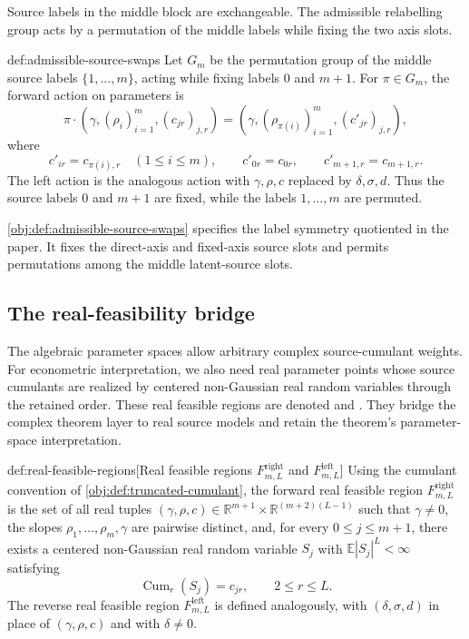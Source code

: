 Source labels in the middle block are exchangeable. The admissible relabelling group  acts by a permutation  of the middle labels while fixing the two axis slots.

\begin{definitionv}{def:admissible-source-swaps}
Let \(G_m\) be the permutation group of the middle source labels \(\{1,\ldots,m\}\), acting while fixing labels \(0\) and \(m+1\). For \(\pi\in G_m\), the forward action on parameters is
\[
\pi\cdot(\gamma,(\rho_i)_{i=1}^m,(c_{jr})_{j,r})
=
(\gamma,(\rho_{\pi(i)})_{i=1}^m,(c'_{jr})_{j,r}),
\]
where
\[
c'_{ir}=c_{\pi(i),r}\quad(1\le i\le m),\qquad
c'_{0r}=c_{0r},\qquad
c'_{m+1,r}=c_{m+1,r}.
\]
The left action is the analogous action with \(\gamma,\rho,c\) replaced by \(\delta,\sigma,d\). Thus the source labels \(0\) and \(m+1\) are fixed, while the labels \(1,\ldots,m\) are permuted.
\end{definitionv}

\cref{obj:def:admissible-source-swaps} specifies the label symmetry quotiented in the paper. It fixes the direct-axis and fixed-axis source slots and permits permutations among the middle latent-source slots.

\subsection{The real-feasibility bridge}

The algebraic parameter spaces allow arbitrary complex source-cumulant weights. For econometric interpretation, we also need real parameter points whose source cumulants are realized by centered non-Gaussian real random variables through the retained order. These real feasible regions are denoted  and . They bridge the complex theorem layer to real source models and retain the theorem's parameter-space interpretation.

\begin{definitionv}{def:real-feasible-regions}[Real feasible regions \(F^{\mathrm{right}}_{m,L}\) and \(F^{\mathrm{left}}_{m,L}\)]
Using the cumulant convention of \cref{obj:def:truncated-cumulant}, the forward real feasible region \(F^{\mathrm{right}}_{m,L}\) is the set of all real tuples \((\gamma,\rho,c)\in \mathbb R^{m+1}\times \mathbb R^{(m+2)(L-1)}\) such that \(\gamma\neq 0\), the slopes \(\rho_1,\ldots,\rho_m,\gamma\) are pairwise distinct, and, for every \(0\leq j\leq m+1\), there exists a centered non-Gaussian real random variable \(S_j\) with \(\mathbb E|S_j|^L<\infty\) satisfying
\[
\operatorname{Cum}_r(S_j)=c_{jr},
\qquad 2\leq r\leq L.
\]
The reverse real feasible region \(F^{\mathrm{left}}_{m,L}\) is defined analogously, with \((\delta,\sigma,d)\) in place of \((\gamma,\rho,c)\) and with \(\delta\neq 0\).
\end{definitionv}

